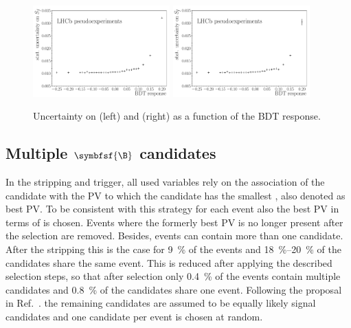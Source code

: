 \begin{figure}[tbp]
    \centering
    \includegraphics[width=0.47\textwidth]{06selection/figs/sensitiv_Sf.pdf}
    \includegraphics[width=0.47\textwidth]{06selection/figs/sensitiv_Sfbar.pdf}
    \caption{Uncertainty on \Sf (left) and \Sfbar (right) as a function of the \ac{BDT} response.}
    \label{fig:BDTopt}
\end{figure}

\subsection[head={Multiple \B candidates},tocentry={Multiple \B candidates}]{Multiple $\symbfsf{\B}$ candidates}
\label{sec:MultCands}

In the stripping and trigger, all used variables rely on the association of the \Bz candidate with the \ac{PV} to which the candidate has the smallest \chisqip, also denoted as best \ac{PV}.
To be consistent with this strategy for each event also the best \ac{PV} in terms of \chisqip is chosen.
Events where the formerly best \ac{PV} is no longer present after the selection are removed.
Besides, events can contain more than one \Bz candidate.
After the stripping this is the case for \SI{9}{\percent} of the events and \SIrange{18}{20}{\percent} of the \Bz candidates share the same event.
This is reduced after applying the described selection steps, so that after selection only \SI{0.4}{\percent} of the events contain multiple candidates and \SI{0.8}{\percent} of the \Bz candidates share one event.
Following the proposal in Ref.~\cite{Koppenburg:2017zsh}. the remaining candidates are assumed to be equally likely signal candidates and one candidate per event is chosen at random.

